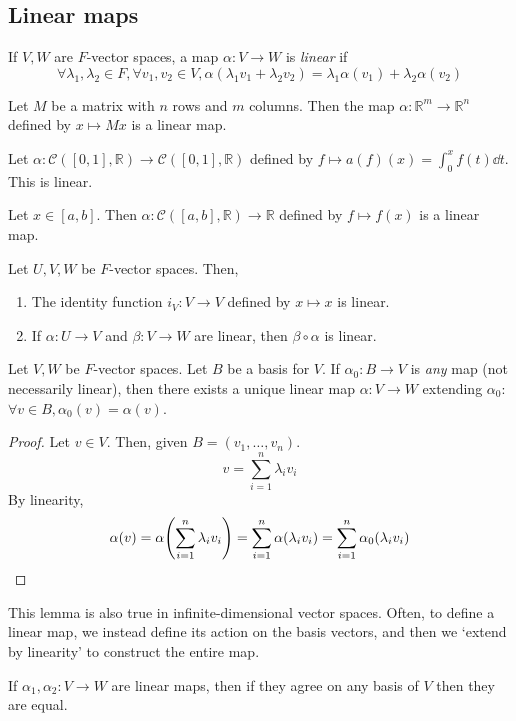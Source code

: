 \subsection{Linear maps}
\begin{definition}
	If \( V, W \) are \( F \)-vector spaces, a map \( \alpha \colon V \to W \) is \textit{linear} if
	\[
		\forall \lambda_1, \lambda_2 \in F, \forall v_1, v_2 \in V, \alpha(\lambda_1 v_1 + \lambda_2 v_2) = \lambda_1 \alpha(v_1) + \lambda_2 \alpha(v_2)
	\]
\end{definition}
\begin{example}
	Let \( M \) be a matrix with \( n \) rows and \( m \) columns.
	Then the map \( \alpha \colon \mathbb R^m \to \mathbb R^n \) defined by \( x \mapsto M x \) is a linear map.
\end{example}
\begin{example}
	Let \( \alpha \colon \mathcal C([0,1], \mathbb R) \to \mathcal C([0,1], \mathbb R) \) defined by \( f \mapsto a(f)(x) = \int_0^x f(t) \dd{t} \).
	This is linear.
\end{example}
\begin{example}
	Let \( x \in [a,b] \).
	Then \( \alpha \colon \mathcal C([a,b], \mathbb R) \to \mathbb R \) defined by \( f \mapsto f(x) \) is a linear map.
\end{example}
\begin{remark}
	Let \( U, V, W \) be \( F \)-vector spaces.
	Then,
	\begin{enumerate}
		\item The identity function \( i_V \colon V \to V \) defined by \( x \mapsto x \) is linear.
		\item If \( \alpha \colon U \to V \) and \( \beta \colon V \to W \) are linear, then \( \beta \circ \alpha \) is linear.
	\end{enumerate}
\end{remark}
\begin{lemma}
	Let \( V, W \) be \( F \)-vector spaces.
	Let \( B \) be a basis for \( V \).
	If \( \alpha_0 \colon B \to V \) is \textit{any} map (not necessarily linear), then there exists a unique linear map \( \alpha \colon V \to W \) extending \( \alpha_0 \): \( \forall v \in B, \alpha_0(v) = \alpha(v) \).
\end{lemma}
\begin{proof}
	Let \( v \in V \).
	Then, given \( B = (v_1, \dots, v_n) \).
	\[
		v = \sum_{i=1}^n \lambda_i v_i
	\]
	By linearity,
	\[
		\alpha(v) = \alpha\qty(\sum_{i=1}^n \lambda_i v_i) = \sum_{i=1}^n \alpha(\lambda_i v_i) = \sum_{i=1}^n \alpha_0(\lambda_i v_i)
	\]
\end{proof}
\begin{remark}
	This lemma is also true in infinite-dimensional vector spaces.
	Often, to define a linear map, we instead define its action on the basis vectors, and then we `extend by linearity' to construct the entire map.
\end{remark}
\begin{remark}
	If \( \alpha_1, \alpha_2 \colon V \to W \) are linear maps, then if they agree on any basis of \( V \) then they are equal.
\end{remark}

